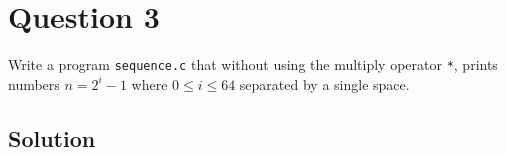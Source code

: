 \documentclass[12pt,letterpaper,twoside]{article}
\begin{document}
\section*{Question 3}

Write a program \texttt{sequence.c} that without using the multiply operator \texttt{*}, prints numbers $n = 2^{i}-1$ where $0 \leq i \leq 64$ separated by a single space.

\subsection*{Solution}

\lstset{language=c,tabsize=4}


\end{document}
